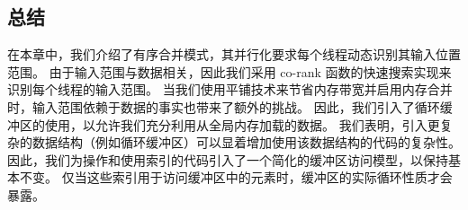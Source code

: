 \subsection{总结}
在本章中，我们介绍了有序合并模式，其并行化要求每个线程动态识别其输入位置范围。 
由于输入范围与数据相关，因此我们采用 co-rank 函数的快速搜索实现来识别每个线程的输入范围。 
当我们使用平铺技术来节省内存带宽并启用内存合并时，输入范围依赖于数据的事实也带来了额外的挑战。 
因此，我们引入了循环缓冲区的使用，以允许我们充分利用从全局内存加载的数据。 
我们表明，引入更复杂的数据结构（例如循环缓冲区）可以显着增加使用该数据结构的代码的复杂性。 
因此，我们为操作和使用索引的代码引入了一个简化的缓冲区访问模型，以保持基本不变。 
仅当这些索引用于访问缓冲区中的元素时，缓冲区的实际循环性质才会暴露。